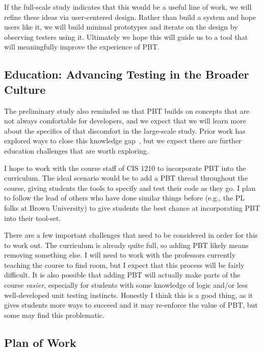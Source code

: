 If the full-scale study indicates that this would be a useful line of work, we
will refine these ideas via user-centered design. Rather than build a system and
hope users like it, we will build minimal prototypes and iterate on the design
by observing testers using it. Ultimately we hope this will guide us to a tool
that will meaningfully improve the experience of PBT.

\subsection{Education: Advancing Testing in the Broader Culture }

The preliminary study also reminded us that PBT builds on concepts that are not
always comfortable for developers, and we expect that we will learn more about
the specifics of that discomfort in the large-scale study.  Prior work has
explored ways to close this knowledge
gap~\cite{wrenn2021using,nelson2021automated}, but we expect there are further
education challenges that are worth exploring.

I hope to work with the course staff of CIS 1210 to incorporate PBT into the
curriculum. The ideal scenario would be to add a PBT thread throughout the
course, giving students the tools to specify and test their code as they go.  I
plan to follow the lead of others who have done similar things before (e.g., the
PL folks at Brown University) to give students the best chance at incorporating
PBT into their tool-set.

There are a few important challenges that need to be considered in order for
this to work out.  The curriculum is already quite full, so adding PBT likely
means removing something else. I will need to work with the professors currently
teaching the course to find room, but I expect that this process will be fairly
difficult. It is also possible that adding PBT will actually make parts of the
course {\em easier}, especially for students with some knowledge of logic and/or
less well-developed unit testing instincts. Honestly I think this is a good
thing, as it gives students more ways to succeed and it may re-enforce the value
of PBT, but some may find this problematic.

\subsection{Plan of Work }


